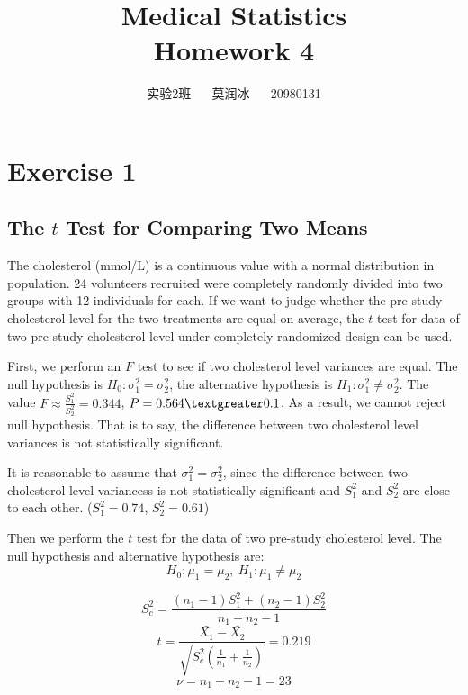 \documentclass[11pt,a4paper,onside,UTF8]{article}
\title{\blue Medical Statistics \\
\blueb Homework 4}
\author{实验2班 ~~ 莫润冰 ~~ 20980131}
\date{}
\begin{document}
\maketitle

\renewcommand{\thefootnote}{\fnsymbol{footnote}}

\section{Exercise 1} 
\subsection{The $t$ Test for Comparing Two Means}

The cholesterol (mmol/L) is a continuous value with a normal distribution in population.
24 volunteers recruited were completely randomly divided into two groups with 12 individuals for each.
If we want to judge whether the pre-study cholesterol level for the two treatments are equal on average,
the $t$ test for data of two pre-study cholesterol level under completely randomized design can be used.

First, we perform an $F$ test to see if two cholesterol level variances are equal. 
The null hypothesis is $H_0: \sigma_1^2=\sigma_2^2$, the alternative hypothesis is $H_1: \sigma_1^2 \neq \sigma_2^2$. 
The value $F\approx \frac{S_1^2}{S_2^2} = 0.344$, $P=0.564 \textgreater 0.1$.
As a result, we cannot reject null hypothesis. That is to say, the difference between two cholesterol level variances is not statistically significant.

It is reasonable to assume that $\sigma_1^2=\sigma_2^2$, since the difference between two cholesterol level variancess is not statistically significant 
and $S_1^2$ and $S_2^2$ are close to each other. ($S_1^2=0.74$, $S_2^2=0.61$)

Then we perform the $t$ test for the data of two pre-study cholesterol level. 
The null hypothesis and alternative hypothesis are:
\begin{equation}
	H_0: \mu_1=\mu_2, \ H_1: \mu_1 \neq \mu_2
\end{equation}

\begin{equation}
	S_c^2=\frac{(n_1-1)S_1^2+(n_2-1)S_2^2}{n_1+n_2-1}
\end{equation}
\begin{equation}
	t=\frac{\bar{X_1}-\bar{X_2}}{\sqrt{S_c^2\left(\frac{1}{n_1}+\frac{1}{n_2}\right)}}=0.219
\end{equation}
\begin{equation}
	\nu = n_1+n_2-1=23
\end{equation}
\end{document}
